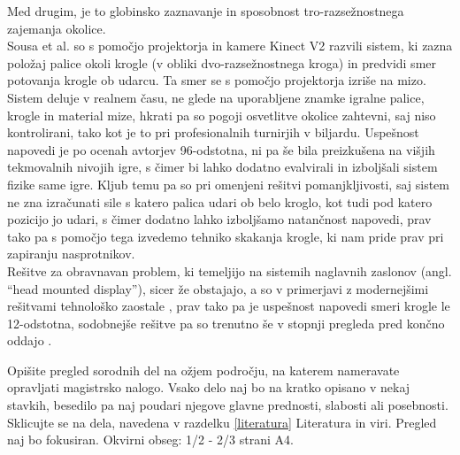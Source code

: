 \documentclass[a4paper, 12pt]{article}
\newcommand\cmnt[1]{\textcolor{munsell}{#1}}
\begin{document}
Med drugim, je to globinsko zaznavanje in sposobnost tro-razsežnostnega zajemanja okolice. \\
Sousa et al. \cite{Sousa2016} so s pomočjo projektorja in kamere Kinect V2 razvili sistem,
ki zazna položaj palice okoli krogle (v obliki dvo-razsežnostnega kroga) in predvidi smer potovanja krogle ob udarcu. Ta smer se s pomočjo projektorja izriše na mizo. Sistem deluje v realnem času, ne glede na uporabljene znamke igralne palice,
krogle in material mize, hkrati pa so pogoji osvetlitve okolice zahtevni, saj niso kontrolirani, tako kot je
to pri profesionalnih turnirjih v biljardu. Uspešnost napovedi je po ocenah avtorjev 96-odstotna, ni pa še bila preizkušena na višjih 
tekmovalnih nivojih igre, s čimer bi lahko dodatno evalvirali in izboljšali sistem fizike same igre. Kljub temu pa so pri omenjeni rešitvi pomanjkljivosti, saj sistem ne zna izračunati sile s katero palica udari ob belo kroglo, kot tudi pod katero pozicijo jo udari, s čimer
dodatno lahko izboljšamo natančnost napovedi, prav tako pa s pomočjo tega izvedemo tehniko skakanja krogle, ki nam pride prav pri zapiranju nasprotnikov. \\
Rešitve za obravnavan problem, ki temeljijo na sistemih naglavnih zaslonov (angl. ``head mounted display''), sicer že obstajajo, a so v primerjavi z modernejšimi rešitvami tehnološko zaostale \cite{Sargaana2005Collaborative}, prav tako pa je uspešnost napovedi smeri krogle le 12-odstotna, sodobnejše rešitve pa so trenutno še v stopnji pregleda pred končno oddajo \cite{Yan2024Enhancing}.


\cmnt{Opišite pregled sorodnih del na ožjem področju, na katerem nameravate opravljati magistrsko nalogo. Vsako delo naj bo na kratko opisano v nekaj stavkih, besedilo pa naj poudari njegove glavne prednosti, slabosti ali posebnosti. Sklicujte se na dela, navedena v razdelku \ref{literatura} Literatura in viri. Pregled naj bo fokusiran.  Okvirni obseg: 1/2 - 2/3 strani A4.}
\end{document}
